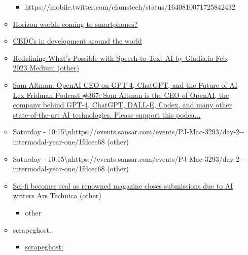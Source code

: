 \begin{itemize}
\begin{itemize}
\begin{itemize}
    \item
      https://mobile.twitter.com/clamstech/status/1640810071725842432
    \end{itemize}
  \item
    \href{https://www.reddit.com/r/virtualreality/comments/u4ahwu/horizon_worlds_coming_to_smartphones_web_probably/}{Horizon
    worlds coming to smartphones?}
  \item
    \href{https://www.reddit.com/r/CryptoCurrency/comments/10wx51p/the_current_list_of_cbdcs_in_development_around/}{CBDCs
    in development around the world}
  \item
    \href{https://medium.com/@gladia.io/gladia-alpha-launch-redefining-what-s-possible-with-speech-to-text-ai-686dd4312a86}{Redefining
    What's Possible with Speech-to-Text AI \textbar{} by Gladia.io
    \textbar{} Feb, 2023 \textbar{} Medium (other)}
  \item
    \href{https://m.youtube.com/watch?v=L_Guz73e6fw\&feature=youtu.be}{Sam
    Altman: OpenAI CEO on GPT-4, ChatGPT, and the Future of AI
    \textbar{} Lex Fridman Podcast \#367: Sam Altman is the CEO of
    OpenAI, the company behind GPT-4, ChatGPT, DALL-E, Codex, and many
    other state-of-the-art AI technologies. Please support this
    podca...}
  \item
    Saturday -
    10:15\textbackslash nhttps://events.sansar.com/events/PJ-Mac-3293/day-2-\/-intermodal-year-one/1fdcec68
    (other)
  \item
    Saturday -
    10:15\textbackslash nhttps://events.sansar.com/events/PJ-Mac-3293/day-2-\/-intermodal-year-one/1fdcec68
    (other)
  \item
    \href{https://arstechnica.com/information-technology/2023/02/sci-fi-becomes-real-as-renowned-magazine-closes-submissions-due-to-ai-writers}{Sci-fi
    becomes real as renowned magazine closes submissions due to AI
    writers \textbar{} Ars Technica (other)}

    \begin{itemize}
     
    \item
      other
    \end{itemize}
  \item
    scrapeghost.

    \begin{itemize}
     
    \item
      \href{https://jamesturk.github.io/scrapeghost/}{scrapeghost:}


\end{itemize}
\end{itemize}
\end{itemize}
